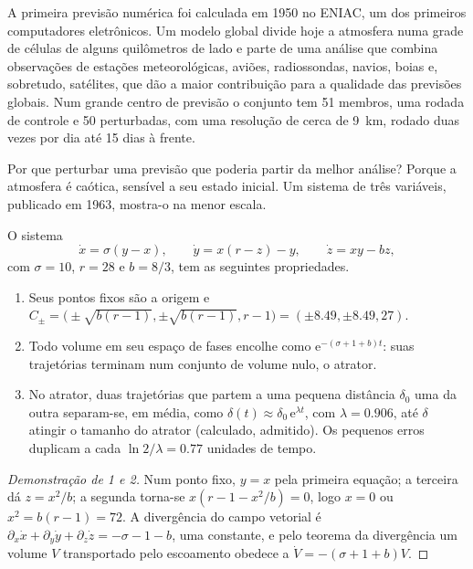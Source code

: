 A primeira previsão numérica foi calculada em 1950 no ENIAC, um dos primeiros computadores
eletrônicos. Um modelo global divide hoje a atmosfera numa grade de células de alguns quilômetros
de lado e parte de uma análise que combina observações de estações meteorológicas, aviões,
radiossondas, navios, boias e, sobretudo, satélites, que dão a maior contribuição para a
qualidade das previsões globais. Num grande centro de previsão o conjunto
tem 51 membros, uma rodada de controle e 50 perturbadas, com uma resolução de cerca de \qty{9}{km}, rodado
duas vezes por dia até 15 dias à frente.

Por que perturbar uma previsão que poderia partir da melhor análise? Porque a atmosfera é
caótica, sensível a seu estado inicial. Um sistema de três variáveis, publicado em 1963, mostra-o
na menor escala.

\begin{proposition}\label{prop:b2:weather-systems:lorenz}
O sistema
\[
  \dot x = \sigma(y - x), \qquad \dot y = x(r - z) - y, \qquad \dot z = xy - bz,
\]
com $\sigma = 10$, $r = 28$ e $b = 8/3$, tem as seguintes propriedades.
\begin{enumerate}
  \item Seus pontos fixos são a origem e $C_\pm = \bigl(\pm\sqrt{b(r - 1)}, \pm\sqrt{b(r - 1)},
        r - 1\bigr) = (\pm 8.49, \pm 8.49, 27)$.
  \item Todo volume em seu espaço de fases encolhe como $\mathrm{e}^{-(\sigma + 1 + b)t}$: suas
        trajetórias terminam num conjunto de volume nulo, o atrator.
  \item No atrator, duas trajetórias que partem a uma pequena distância $\delta_0$ uma da outra separam-se,
        em média, como $\delta(t) \approx \delta_0\,\mathrm{e}^{\lambda t}$, com $\lambda =
        0.906$, até $\delta$ atingir o tamanho do atrator (calculado, admitido). Os pequenos
        erros duplicam a cada $\ln 2/\lambda = 0.77$ unidades de tempo.
\end{enumerate}
\end{proposition}

\begin{proof}[Demonstração de 1 e 2]
Num ponto fixo, $y = x$ pela primeira equação; a terceira dá $z = x^2/b$; a segunda
torna-se $x(r - 1 - x^2/b) = 0$, logo $x = 0$ ou $x^2 = b(r - 1) = 72$. A divergência do
campo vetorial é $\partial_x\dot x + \partial_y\dot y + \partial_z\dot z = -\sigma - 1 - b$, uma
constante, e pelo teorema da divergência um volume $V$ transportado pelo escoamento obedece a $\dot V =
-(\sigma + 1 + b)V$.
\end{proof}

